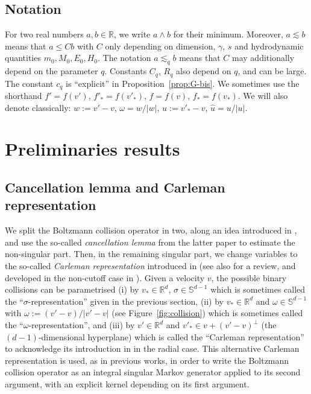 \documentclass[JEP,XML,SOM,Unicode,NoFloatCountersInSection]{cedram}
\theoremstyle{plain}
\theoremstyle{definition}
\numberwithin{equation}{section}
\newcommand{\R}{\mathbb R}
\begin{document}
\subsection{Notation} For two real numbers $a,b \in \R$, we write
$a \wedge b$ for their minimum. Moreover, $a \lesssim b$ means that
$ a \le C b$ with $C$ only depending on dimension, $\gamma$, $s$ and
hydrodynamic quantities $m_0, M_0, E_0, H_0$. The notation
$a \lesssim_q b$ means that $C$ may additionally depend on the
parameter $q$. Constants $C_q$, $R_q$ also depend on $q$, and can be
large. The constant $c_q$ is ``explicit'' in
Proposition~\ref{prop:G-bis}. We sometimes use the shorthand
$f'=f(v')$, $f'_*=f(v'_*)$, $f=f(v)$, $f_*=f(v_*)$. We will also
denote classically: $w:=v'-v$, $\omega = w/|w|$, $u:=v'_*-v$,
$\hat u = u/|u|$.

\section{Preliminaries results}
\label{s:prelim}

\subsection{Cancellation lemma and Carleman representation}

We split the Boltzmann collision operator in two, along an idea
introduced in \cite{advw}, and use the so-called \emph{cancellation
lemma} from the latter paper to estimate the non-singular
part. Then, in the remaining singular part, we change variables to the
so-called \emph{Carleman representation} introduced in
\cite{MR1555365,MR0098477} (see also
\cite[\S 4.6]{villani-book} for a review, and developed in the
non-cutoff case in \cite[\S 4]{luis}). Given a velocity $v$, the
possible binary collisions can be parametrised (i) by $v_* \in \R^d$,
$\sigma \in \mathbb S^{d-1}$ which is sometimes called the
``$\sigma$-representation'' given in the previous section, (ii) by
$v_* \in \R^d$ and $\omega \in \mathbb S^{d-1}$ with
$\omega := (v'-v)/|v'-v|$ (see Figure~\ref{fig:collision}) which is
sometimes called the ``$\omega$-representation'', and (iii) by
$v' \in \R^d$ and $v'_* \in v + (v'-v)^\bot$ (the $(d-1)$-dimensional
hyperplane) which is called the ``Carleman representation'' to
acknowledge its introduction in \cite{MR1555365} in the radial
case. This alternative Carleman representation is used, as in previous
works, in order to write the Boltzmann collision operator as an
integral singular Markov generator applied to its second argument,
with an explicit kernel depending on its first argument.
\end{document}
